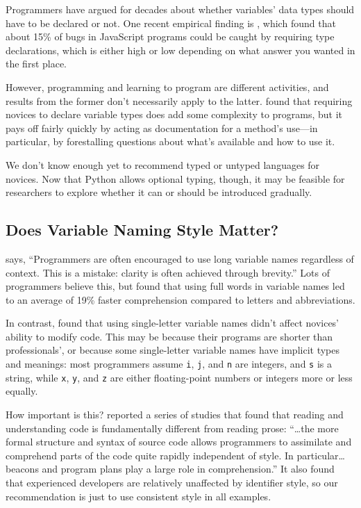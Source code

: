 Programmers have argued for decades about whether variables' data
types should have to be declared or not.  One recent empirical finding
is \cite{Gao2017}, which found that about 15\% of bugs in JavaScript
programs could be caught by requiring type declarations, which is
either high or low depending on what answer you wanted in the first
place.

However, programming and learning to program are different activities,
and results from the former don't necessarily apply to the latter.
\cite{Endr2014} found that requiring novices to declare variable types
does add some complexity to programs, but it pays off fairly quickly
by acting as documentation for a method's use---in particular, by
forestalling questions about what's available and how to use it.

We don't know enough yet to recommend typed or untyped languages for
novices.  Now that Python allows optional typing, though, it may be
feasible for researchers to explore whether it can or should be
introduced gradually.

\subsection*{Does Variable Naming Style Matter?}

\cite{Kern1999} says, ``Programmers are often encouraged to use long
variable names regardless of context. This is a mistake: clarity is
often achieved through brevity.''  Lots of programmers believe this,
but \cite{Hofm2017} found that using full words in variable names led
to an average of 19\% faster comprehension compared to letters and
abbreviations.

In contrast, \cite{Beni2017} found that using single-letter variable
names didn't affect novices' ability to modify code.  This may be
because their programs are shorter than professionals', or because
some single-letter variable names have implicit types and meanings:
most programmers assume \texttt{i}, \texttt{j}, and \texttt{n} are
integers, and \texttt{s} is a string, while \texttt{x}, \texttt{y},
and \texttt{z} are either floating-point numbers or integers more or
less equally.

How important is this?  \cite{Bink2012} reported a series of studies
that found that reading and understanding code is fundamentally
different from reading prose: ``{\ldots}the more formal structure and
syntax of source code allows programmers to assimilate and comprehend
parts of the code quite rapidly independent of style.  In
particular{\ldots}beacons and program plans play a large role in
comprehension.''  It also found that experienced developers are
relatively unaffected by identifier style, so our recommendation is
just to use consistent style in all examples.

